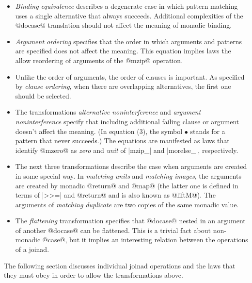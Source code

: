\documentclass[preprint]{sigplanconf}
\begin{document}
\begin{itemize}
\item \textit{Binding equivalence} describes a degenerate case in which pattern matching uses
  a single alternative that always succeeds. Additional complexities of the @docase@ translation
  should not affect the meaning of monadic binding.
  
\item \textit{Argument ordering} specifies that the order in which arguments and patterns are
  specified does not affect the meaning. This equation implies laws the allow reordering of 
  arguments of the @mzip@ operation.

\item Unlike the order of arguments, the order of clauses is important. As specified by 
  \textit{clause ordering}, when there are overlapping alternatives, the first one should be 
  selected.

\item The transformations \textit{alternative noninterference} and \textit{argument noninterference}
  specify that including additional failing clause or argument doesn't affect the meaning. (In 
  equation (3), the symbol $\bullet$ stands for a pattern that never succeeds.) The equations are
  manifested as laws that identify @mzero@ as \textit{zero} and \textit{unit} of |mzip_| and
  |morelse_|, respectively.

\item The next three transformations describe the case when arguments are created in some special way.
  In \textit{matching units} and \textit{matching images}, the arguments are created by monadic
  @return@ and @map@ (the latter one is defined in terms of |>>=| and @return@ and is also known
  as @liftM@). The arguments of \textit{matching duplicate} are two copies of the same monadic
  value.

\item The \textit{flattening} transformation specifies that @docase@ nested in an argument of 
  another @docase@ can be flattened. This is a trivial fact about non-monadic @case@, but it 
  implies an interesting relation between the operations of a joinad.
\end{itemize}

The following section discusses individual joinad operations and the laws that they must obey
in order to allow the transformations above.

\end{document}

